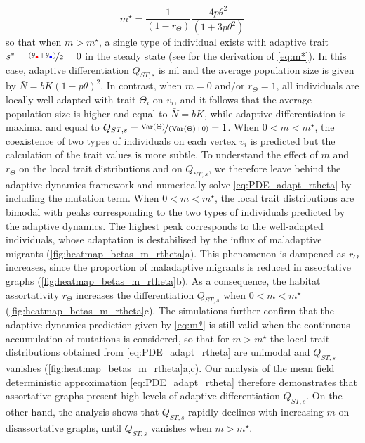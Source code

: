 \begin{equation}\label{eq:m*}
    m^\star = \frac{1}{(1-r_\Theta)}\frac{4 p \theta^2}{(1 + 3 p \theta^2)}
\end{equation}
so that when $m > m^\star$, a single type of individual exists with adaptive trait $s^* = \nicefrac{\left(\theta_{\rcirc} + \theta_{\bcirc}\right)}{2} = 0$ in the steady state (see  for the derivation of \cref{eq:m*}). In this case, adaptive differentiation $Q_{ST,s}$ is nil and the average population size is given by $\bar{N} = bK(1-p\theta)^2$.
%
In contrast, when $m=0$ and/or $r_\Theta = 1$, all individuals are locally well-adapted with trait $\Theta_i$ on $v_i$, and it follows that the average population size is higher and equal to $\bar{N} = bK$, while adaptive differentiation is maximal and equal to $Q_{ST,s} = \nicefrac{{\operatorname{Var}}(\Theta)}{\left({\operatorname{Var}}(\Theta) + 0\right)} = 1$. 
%
When $0 < m < m^\star$, the coexistence of two types of individuals on each vertex $v_i$ is predicted but the calculation of the trait values is more subtle.
%
To understand the effect of $m$ and $r_\Theta$ on the local trait distributions and on $Q_{ST,s}$, we therefore leave behind the adaptive dynamics framework and numerically solve \cref{eq:PDE_adapt_rtheta} by including the mutation term. When $0 < m < m^\star$, the local trait distributions are bimodal with peaks corresponding to the two types of individuals predicted by the adaptive dynamics. The highest peak corresponds to the well-adapted individuals, whose adaptation is destabilised by the influx of maladaptive migrants (\cref{fig:heatmap_betas_m_rtheta}a). This phenomenon is dampened as $r_\Theta$ increases, since the proportion of maladaptive migrants is reduced in assortative graphs (\cref{fig:heatmap_betas_m_rtheta}b).
%
As a consequence, the habitat assortativity $r_\Theta$ increases the differentiation $Q_{ST,s}$ when $ 0 < m < m^\star$ (\cref{fig:heatmap_betas_m_rtheta}c). The simulations further confirm that the adaptive dynamics prediction given by \cref{eq:m*} is still valid when the continuous accumulation of mutations is considered, so that for $m > m^\star$ the local trait distributions obtained from \cref{eq:PDE_adapt_rtheta} are unimodal and $Q_{ST,s}$ vanishes (\cref{fig:heatmap_betas_m_rtheta}a,c). Our analysis of the mean field deterministic approximation \cref{eq:PDE_adapt_rtheta} therefore demonstrates that assortative graphs present high levels of adaptive differentiation $Q_{ST,s}$. On the other hand, the analysis shows that $Q_{ST,s}$ rapidly declines with increasing $m$ on disassortative graphs, until $Q_{ST,s}$ vanishes when $m > m^\star$.

